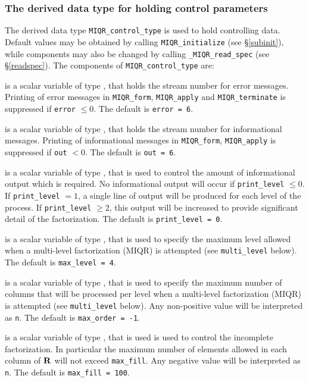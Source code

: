 \documentclass{galahad}
\newcommand{\packagename}{MIQR}
\newcommand{\fullpackagename}{\libraryname\_\packagename}
\begin{document}

\subsubsection{The derived data type for holding control 
 parameters}\label{typecontrol}
The derived data type 
{\tt \packagename\_control\_type} 
is used to hold controlling data. Default values may be obtained by calling 
{\tt \packagename\_initialize}
(see \S\ref{subinit}),
while components may also be changed by calling 
{\tt \fullpackagename\_read\-\_spec}
(see \S\ref{readspec}). 
The components of 
{\tt \packagename\_control\_type} 
are:

\begin{description}

 is a scalar variable of type \integer, that holds the
stream number for error messages. Printing of error messages in 
{\tt \packagename\_form}, {\tt \packagename\_apply} 
and {\tt \packagename\_terminate} 
is suppressed if {\tt error} $\leq 0$.
The default is {\tt error = 6}.

 is a scalar variable of type \integer, that holds the
stream number for informational messages. Printing of informational messages in 
{\tt \packagename\_form}, {\tt \packagename\_apply} 
is suppressed if {\tt out} $< 0$.
The default is {\tt out = 6}.

 is a scalar variable of type \integer, that is used
to control the amount of informational output which is required. No 
informational output will occur if {\tt print\_level} $\leq 0$. If 
{\tt print\_level} $= 1$, a single line of output will be produced for each
level of the process. If {\tt print\_level} $\geq 2$, this output will be
increased to provide significant detail of the factorization.
The default is {\tt print\_level = 0}.

 is a scalar variable of type \integer, that is used
to specify the maximum level allowed when a multi-level factorization (MIQR)
is attempted (see {\tt multi\_level} below).
The default is {\tt max\_level = 4}.

 is a scalar variable of type \integer, that is used
to specify the maximum number of columns that will be processed per level 
when a multi-level factorization (MIQR) is attempted 
(see {\tt multi\_level} below).
Any non-positive value will be interpreted as {\tt n}.
The default is {\tt max\_order = -1}.

 is a scalar variable of type \integer, that is used
is used to control the incomplete factorization. In particular
the maximum number of elements allowed in each column of ${\mathbf{R}}$ will not exceed
{\tt max\_fill}.
Any negative value will be interpreted as {\tt n}.
The default is {\tt max\_fill = 100}.


\end{description}
\end{document}
